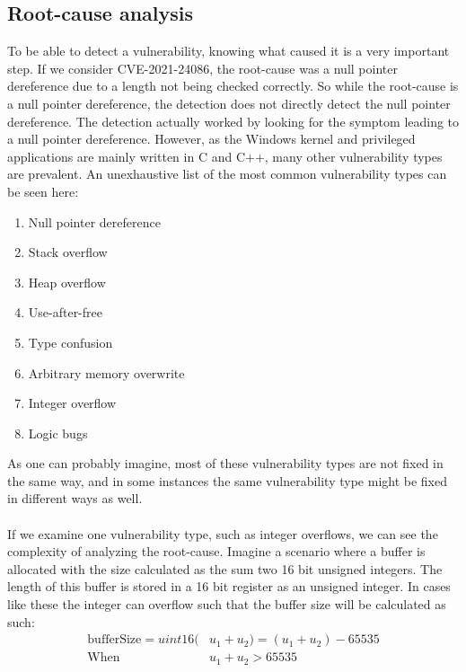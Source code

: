 \documentclass{report}
\begin{document}
\subsection{Root-cause analysis}
To be able to detect a vulnerability, knowing what caused it is a very important step. If we consider CVE-2021-24086, the root-cause was a null pointer dereference due to a length not being checked correctly. So while the root-cause is a null pointer dereference, the detection does not directly detect the null pointer dereference. The detection actually worked by looking for the symptom leading to a null pointer dereference. However, as the Windows kernel and privileged applications are mainly written in C and C++, many other vulnerability types are prevalent. An unexhaustive list of the most common vulnerability types can be seen here:

\begin{enumerate}
    \item Null pointer dereference
    \item Stack overflow
    \item Heap overflow
    \item Use-after-free
    \item Type confusion
    \item Arbitrary memory overwrite
    \item Integer overflow
    \item Logic bugs
\end{enumerate}

As one can probably imagine, most of these vulnerability types are not fixed in the same way, and in some instances the same vulnerability type might be fixed in different ways as well.
\\
\\
If we examine one vulnerability type, such as integer overflows, we can see the complexity of analyzing the root-cause. Imagine a scenario where a buffer is allocated with the size calculated as the sum two 16 bit unsigned integers. The length of this buffer is stored in a 16 bit register as an unsigned integer. In cases like these the integer can overflow such that the buffer size will be calculated as such:
\begin{align}
    \text{bufferSize} = uint16(&u_1 + u_2) = (u_1 + u_2) - 65535 \\
    \text{When }&u_1 + u_2 > 65535 \nonumber
\end{align}
\end{document}
